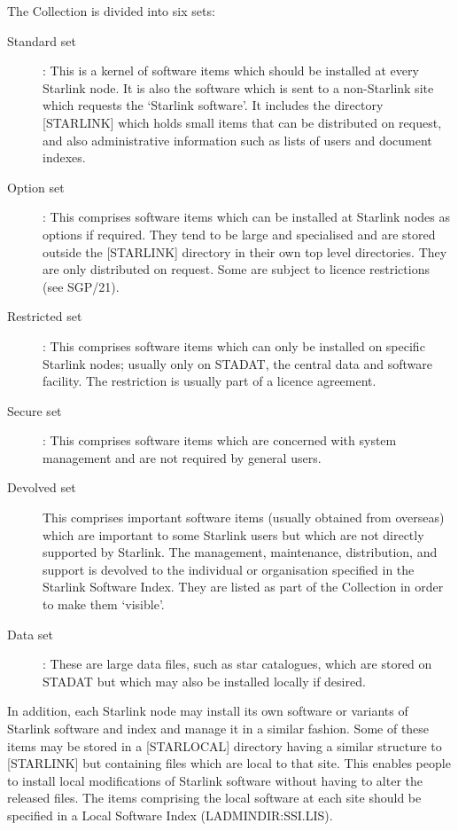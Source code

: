 The Collection is divided into six sets:
\begin{description}
\item [Standard set]:
This is a kernel of software items which should be installed at every Starlink
node.
It is also the software which is sent to a non-Starlink site which requests the
`Starlink software'.
It includes the directory [STARLINK] which holds small items that can be
distributed on request, and also administrative information such as lists of
users and document indexes.
\item [Option set]:
This comprises software items which can be installed at Starlink nodes as
options if required.
They tend to be large and specialised and are stored outside the [STARLINK]
directory in their own top level directories.
They are only distributed on request.
Some are subject to licence restrictions (see SGP/21).
\item [Restricted set]:
This comprises software items which can only be installed on specific Starlink
nodes; usually only on STADAT, the central data and software facility.
The restriction is usually part of a licence agreement.
\item [Secure set]:
This comprises software items which are concerned with system management and
are not required by general users.
\item [Devolved set]
This comprises important software items (usually obtained from overseas) which
are important to some Starlink users but which are not directly supported by
Starlink.
The management, maintenance, distribution, and support is devolved to the
individual or organisation specified in the Starlink Software Index.
They are listed as part of the Collection in order to make them `visible'.
\item [Data set]:
These are large data files, such as star catalogues, which are stored on STADAT
but which may also be installed locally if desired.
\end{description}
In addition, each Starlink node may install its own software or variants of
Starlink software and index and manage it in a similar fashion.
Some of these items may be stored in a [STARLOCAL] directory having a similar
structure to [STARLINK] but containing files which are local to that site.
This enables people to install local modifications of Starlink software
without having to alter the released files.
The items comprising the local software at each site should be specified in
a Local Software Index (LADMINDIR:SSI.LIS).

